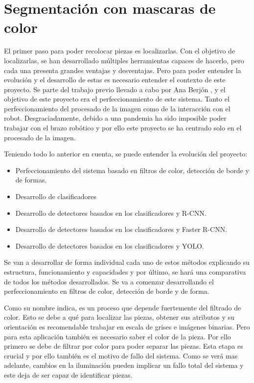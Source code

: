 \chapter{Segmentación con mascaras de color}
\label{chap:Segmentacion con mascaras de color}

El primer paso para poder recolocar piezas es localizarlas. Con el objetivo de localizarlas, se han desarrollado múltiples herramientas capaces de hacerlo, pero cada una presenta grandes ventajas y desventajas. Pero para poder entender la evolución y el desarrollo de estas es necesario entender el contexto de este proyecto. Se parte del trabajo previo llevado a cabo por Ana Berjón \citep{TFGAna}, y el objetivo de este proyecto era el perfeccionamiento de este sistema. Tanto el perfeccionamiento del procesado de la imagen como de la interacción con el robot. Desgraciadamente, debido a una pandemia ha sido imposible poder trabajar con el brazo robótico y por ello este proyecto se ha centrado solo en el procesado de la imagen.

Teniendo todo lo anterior en cuenta, se puede entender la evolución del proyecto:
\begin{itemize}
\item Perfeccionamiento del sistema basado en filtros de color, detección de borde y de formas.
\item Desarrollo de clasificadores
\item Desarrollo de detectores basados en los clasificadores y R-CNN.
\item Desarrollo de detectores basados en los clasificadores y Faster R-CNN.
\item Desarrollo de detectores basados en los clasificadores y YOLO.
\end{itemize}
Se van a desarrollar de forma individual cada uno de estos métodos explicando su estructura, funcionamiento y capacidades y por último, se hará una comparativa de todos los métodos desarrollados. Se va a comenzar desarrollando el perfeccionamiento en filtros de color, detección de borde y de forma.


Como su nombre indica, es un proceso que depende fuertemente del filtrado de color. Esto se debe a qué para localizar las piezas, obtener sus atributos y su orientación es recomendable trabajar en escala de grises e imágenes binarias. Pero para esta aplicación también es necesario saber el color de la pieza. Por ello primero se debe de filtrar por color para poder separar las piezas. Esta etapa es crucial y por ello también es el motivo de fallo del sistema. Como se verá mas adelante, cambios en la iluminación pueden implicar un fallo total del sistema y este deja de ser capaz de identificar piezas.

